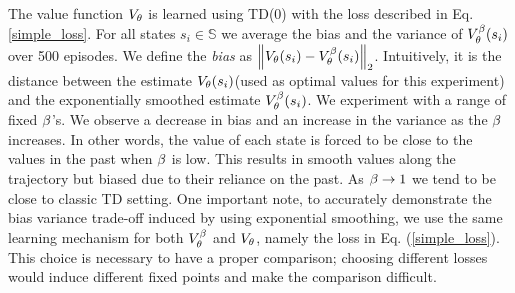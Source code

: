 The value function $V_{\theta}$ is learned using TD(0) with the loss described in Eq. \ref{simple_loss}. For all states $s_i \in \mathbb{S}$ we average the bias and the variance of $V^{\beta}_{\theta}(s_i)$ over 500 episodes. We define the \emph{bias} as $\left\lVert V_{\theta}(s_i) - V^{\beta}_{\theta}(s_i)\right\rVert_{2}$. Intuitively, it is the distance between the estimate $V_{\theta}(s_i)$(used as optimal values for this experiment) and the exponentially smoothed estimate $V^{\beta}_{\theta}(s_i)$. We experiment with a range of fixed $\beta$'s. We observe a decrease in bias and an increase in the variance as the $\beta$ increases. In other words, the value of each state is forced to be close to the values in the past when $\beta$ is low. This results in smooth values along the trajectory but biased due to their reliance on the past. As $\beta \to 1$ we tend to be close to classic TD setting. One important note, to accurately demonstrate the bias variance trade-off induced by using exponential smoothing, we use the same learning mechanism for both $V^{\beta}_{\theta}$ and $V_{\theta}$, namely the loss in Eq. (\ref{simple_loss}). This choice is necessary to have a proper comparison; choosing different losses would induce different fixed points and make the comparison difficult.

